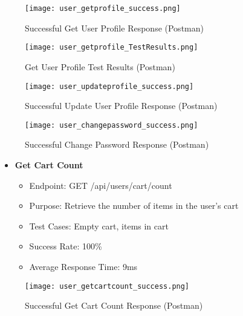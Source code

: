 \begin{figure}[h!]
    \centering
    \texttt{[image: user\_getprofile\_success.png]}
    \caption{Successful Get User Profile Response (Postman)}
    \label{fig:user_getprofile_success}
\end{figure}

\begin{figure}[h!]
    \centering
    \texttt{[image: user\_getprofile\_TestResults.png]}
    \caption{Get User Profile Test Results (Postman)}
    \label{fig:user_getprofile_testresults}
\end{figure}

\begin{figure}[h!]
    \centering
    \texttt{[image: user\_updateprofile\_success.png]}
    \caption{Successful Update User Profile Response (Postman)}
    \label{fig:user_updateprofile_success}
\end{figure}

\begin{figure}[h!]
    \centering
    \texttt{[image: user\_changepassword\_success.png]}
    \caption{Successful Change Password Response (Postman)}
    \label{fig:user_changepassword_success}
\end{figure}

\begin{itemize}
    \item \textbf{Get Cart Count}
    \begin{itemize}
        \item Endpoint: GET /api/users/cart/count
        \item Purpose: Retrieve the number of items in the user's cart
        \item Test Cases: Empty cart, items in cart
        \item Success Rate: 100\%
        \item Average Response Time: 9ms
    \end{itemize}
\end{itemize}

\begin{figure}[h!]
    \centering
    \texttt{[image: user\_getcartcount\_success.png]}
    \caption{Successful Get Cart Count Response (Postman)}
    \label{fig:user_getcartcount_success}
\end{figure}

